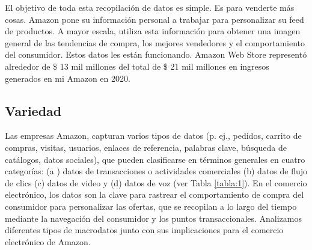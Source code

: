 El objetivo de toda esta recopilación de datos es simple. Es para venderte más cosas. Amazon pone su información personal a trabajar para personalizar su feed de productos. A mayor escala, utiliza esta información para obtener una imagen general de las tendencias de compra, los mejores vendedores y el comportamiento del consumidor. Estos datos les están funcionando. Amazon Web Store representó alrededor de $\$$ 13 mil millones del total de $\$$ 21 mil millones en ingresos generados en mi Amazon en 2020.
\clearpage

\subsection{Variedad}
Las empresas Amazon, capturan varios tipos de datos (p. ej., pedidos, carrito de compras, visitas, usuarios, enlaces de referencia, palabras clave, búsqueda de catálogos, datos sociales), que pueden clasificarse en términos generales en cuatro categorías: (a ) datos de transacciones o actividades comerciales (b) datos de flujo de clics (c) datos de video y (d) datos de voz (ver Tabla \ref{tabla:1}). En el comercio electrónico, los datos son la clave para rastrear el comportamiento de compra del consumidor para personalizar las ofertas, que se recopilan a lo largo del tiempo mediante la navegación del consumidor y los puntos transaccionales. Analizamos  diferentes tipos de macrodatos junto con sus implicaciones para el comercio electrónico de Amazon.


